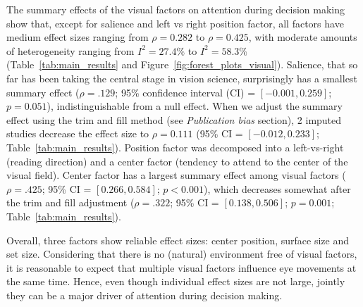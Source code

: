 \documentclass[english,natbib,man,floatsintext]{apa6}
\begin{document}
The summary effects of the visual factors on attention during decision making show that, except for salience and left vs right position factor, all factors have medium effect sizes ranging from $\rho = 0.282$ to $\rho = 0.425$, with moderate amounts of heterogeneity ranging from $I^2 = 27.4\%$ to $I^2 = 58.3\%$ (Table~\ref{tab:main_results} and Figure~\ref{fig:forest_plots_visual}). Salience, that so far has been taking the central stage in vision science, surprisingly has a smallest summary effect ($\rho = .129$; 95\% confidence interval (CI) = $[-0.001,0.259]$; $p=0.051$), indistinguishable from a null effect. When we adjust the summary effect using the trim and fill method (see \textit{Publication bias} section), 2 imputed studies decrease the effect size to $\rho = 0.111$ (95\% CI = $[-0.012,0.233]$; Table~\ref{tab:main_results}). Position factor was decomposed into a left-vs-right (reading direction) and a center factor (tendency to attend to the center of the visual field). Center factor has a largest summary effect among visual factors ($\rho = .425$; 95\% CI = $[0.266,0.584]$; $p<0.001$), which decreases somewhat after the trim and fill adjustment ($\rho = .322$; 95\% CI = $[0.138,0.506]$; $p=0.001$; Table~\ref{tab:main_results}). 

Overall, three factors show reliable effect sizes: center position, surface size and set size. Considering that there is no (natural) environment free of visual factors, it is reasonable to expect that multiple visual factors influence eye movements at the same time. Hence, even though individual effect sizes are not large, jointly they can be a major driver of attention during decision making.



\end{document}
